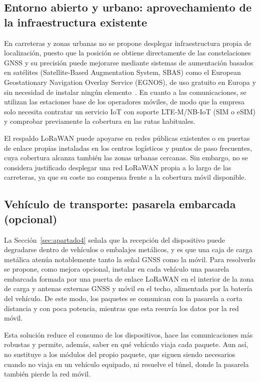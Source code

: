 \documentclass[11pt,a4paper]{article}
\begin{document}
\subsection{Entorno abierto y urbano: aprovechamiento de la infraestructura existente}
\label{sec:apartado6_1}

En carreteras y zonas urbanas no se propone desplegar infraestructura propia de localización, puesto que la posición se obtiene directamente de las constelaciones GNSS y su precisión puede mejorarse mediante sistemas de aumentación basados en satélites (Satellite-Based Augmentation System, SBAS) como el European Geostationary Navigation Overlay Service (EGNOS), de uso gratuito en Europa y sin necesidad de instalar ningún elemento~\cite{ref8}. En cuanto a las comunicaciones, se utilizan las estaciones base de los operadores móviles, de modo que la empresa solo necesita contratar un servicio IoT con soporte LTE-M/NB-IoT (SIM o eSIM) y comprobar previamente la cobertura en las rutas habituales.

El respaldo LoRaWAN puede apoyarse en redes públicas existentes o en puertas de enlace propias instaladas en los centros logísticos y puntos de paso frecuentes, cuya cobertura alcanza también las zonas urbanas cercanas. Sin embargo, no se considera justificado desplegar una red LoRaWAN propia a lo largo de las carreteras, ya que su coste no compensa frente a la cobertura móvil disponible.

\subsection{Vehículo de transporte: pasarela embarcada (opcional)}
\label{sec:apartado6_2}

La Sección~\ref{sec:apartado4} señala que la recepción del dispositivo puede degradarse dentro de vehículos o embalajes metálicos, y es que una caja de carga metálica atenúa notablemente tanto la señal GNSS como la móvil. Para resolverlo se propone, como mejora opcional, instalar en cada vehículo una pasarela embarcada formada por una puerta de enlace LoRaWAN en el interior de la zona de carga y antenas externas GNSS y móvil en el techo, alimentada por la batería del vehículo. De este modo, los paquetes se comunican con la pasarela a corta distancia y con poca potencia, mientras que esta reenvía los datos por la red móvil.

Esta solución reduce el consumo de los dispositivos, hace las comunicaciones más robustas y permite, además, saber en qué vehículo viaja cada paquete. Aun así, no sustituye a los módulos del propio paquete, que siguen siendo necesarios cuando no viaja en un vehículo equipado, ni resuelve el túnel, donde la pasarela también pierde la red móvil.
\end{document}
